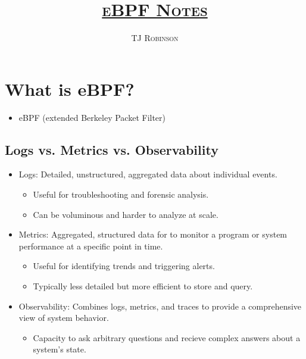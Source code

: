 \documentclass[a4paper,12pt]{article}
\begin{document}
\title{\underline{\scshape{eBPF Notes}}}
\author{\scshape{TJ Robinson}}
\maketitle

\section{What is eBPF?}
\begin{itemize}
    \item eBPF (extended Berkeley Packet Filter)
\end{itemize}

\subsection{Logs vs. Metrics vs. Observability}
\begin{itemize}
    \item Logs: Detailed, unstructured, aggregated data about individual events.
    \begin{itemize}
        \item  Useful for troubleshooting and forensic analysis.
        \item Can be voluminous and harder to analyze at scale.
    \end{itemize}
    \item Metrics: Aggregated, structured data for to monitor a program or system performance at a specific point in time.
    \begin{itemize}
        \item Useful for identifying trends and triggering alerts.
        \item Typically less detailed but more efficient to store and query.
    \end{itemize}
    \item Observability: Combines logs, metrics, and traces to provide a comprehensive view of system behavior.
    \begin{itemize}
        \item Capacity to ask arbitrary questions and recieve complex answers about a system's state.
    \end{itemize}
\end{itemize}
\end{document}
